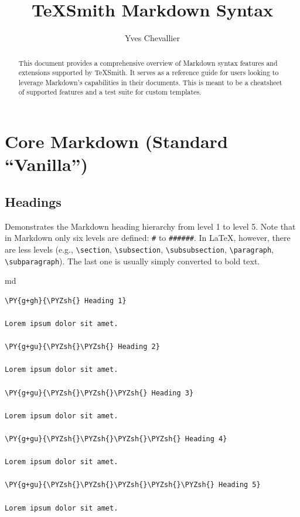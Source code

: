 \documentclass[a4paper,twoside]{article}
\title{TeXSmith Markdown Syntax}
\author{Yves Chevallier}\date{}
\begin{document}
\maketitle
\begin{abstract}
This document provides a comprehensive overview of Markdown syntax features and extensions supported by TeXSmith. It serves as a reference guide for users looking to leverage Markdown's capabilities in their documents. This is meant to be a cheatsheet of supported features and a test suite for custom templates.

\end{abstract}
\tableofcontents

\thispagestyle{plain}
\section{Core Markdown (Standard \enquote{Vanilla})}\label{core-markdown-standard-enquote-vanilla}

\subsection{Headings}\label{headings}

Demonstrates the Markdown heading hierarchy from level 1 to level 5. Note that in Markdown only six levels are defined: \texttt{\#} to \texttt{\#\#\#\#\#\#}. In \LaTeX{}, however, there are less levels (e.g., \texttt{\textbackslash{}section}, \texttt{\textbackslash{}subsection}, \texttt{\textbackslash{}subsubsection}, \texttt{\textbackslash{}paragraph}, \texttt{\textbackslash{}subparagraph}). The last one is usually simply converted to bold text.

\begin{code}{md}{}{}
\begin{Verbatim}[commandchars=\\\{\},breaklines, breakanywhere, commandchars=\\\{\}]
\PY{g+gh}{\PYZsh{} Heading 1}

Lorem ipsum dolor sit amet.

\PY{g+gu}{\PYZsh{}\PYZsh{} Heading 2}

Lorem ipsum dolor sit amet.

\PY{g+gu}{\PYZsh{}\PYZsh{}\PYZsh{} Heading 3}

Lorem ipsum dolor sit amet.

\PY{g+gu}{\PYZsh{}\PYZsh{}\PYZsh{}\PYZsh{} Heading 4}

Lorem ipsum dolor sit amet.

\PY{g+gu}{\PYZsh{}\PYZsh{}\PYZsh{}\PYZsh{}\PYZsh{} Heading 5}

Lorem ipsum dolor sit amet.
\end{Verbatim}
\end{code}
\end{document}
